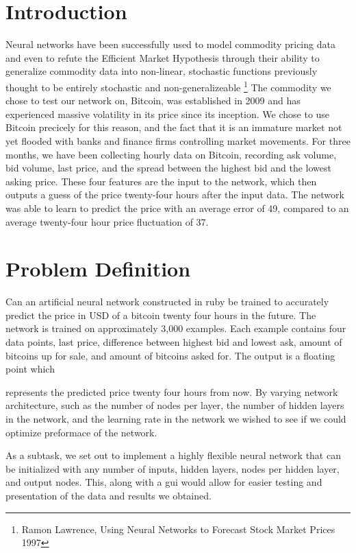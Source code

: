 \documentclass[a4paper,11pt]{article}
\begin{document}
\section{Introduction}
Neural networks have been successfully used to
model commodity pricing data and even to refute the Efficient Market Hypothesis
through their ability to generalize commodity data into non-linear, 
stochastic functions previously thought to be entirely stochastic and non-generalizeable
\footnote{Ramon Lawrence, Using Neural Networks to Forecast Stock Market Prices 1997}
The commodity we chose to test our network on, Bitcoin, was established in 2009 and has 
experienced massive volatility in its price since its inception.  We chose to use Bitcoin 
precicely for this reason, and the fact that it is an immature market not yet flooded with
banks and finance firms controlling market movements.
\newline \newline
For three months, we have been collecting hourly data on Bitcoin, recording
ask volume, bid volume, last price, and the spread between the highest bid and the lowest asking price.
These four features are the input to the network, which then outputs a guess of the price twenty-four
hours after the input data.  The network was able to learn to predict the price with an average error
of 49\cent, compared to an average twenty-four hour price fluctuation of 37\cent. 

\section{Problem Definition}
Can an artificial neural network constructed in ruby be trained to accurately predict the price in USD
of a bitcoin twenty four hours in the future.  The network is trained on approximately 3,000 examples.
Each example contains four data points, last price, difference between highest bid and lowest ask,
amount of bitcoins up for sale, and amount of bitcoins asked for.  The output is a floating point which

represents the predicted price twenty four hours from now. 
By varying network architecture, such as the number of nodes per layer, 
the number of hidden layers in the network, and the learning rate in the network 
we wished to see if we could optimize preformace of the network. 

As a subtask, we set out to implement a highly
flexible neural network that can be initialized with any number of inputs, hidden layers, nodes per hidden
layer, and output nodes.  This, along with a gui would allow for easier testing and presentation of the 
data and results we obtained.
 
\end{document}
